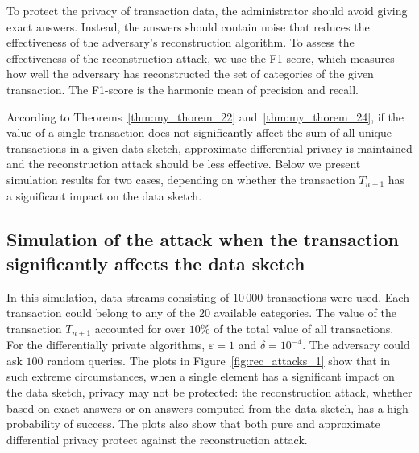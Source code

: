 To protect the privacy of transaction data, the administrator should avoid giving exact answers. Instead, the answers should contain noise that reduces the effectiveness of the adversary's reconstruction algorithm. To assess the effectiveness of the reconstruction attack, we use the F1-score, which measures how well the adversary has reconstructed the set of categories of the given transaction. The F1-score is the harmonic mean of precision and recall.

According to Theorems~\ref{thm:my_thorem_22} and~\ref{thm:my_thorem_24}, if the value of a single transaction does not significantly affect the sum of all unique transactions in a given data sketch, approximate differential privacy is maintained and the reconstruction attack should be less effective. Below we present simulation results for two cases, depending on whether the transaction $T_{n+1}$ has a significant impact on the data sketch.

\subsection{Simulation of the attack when the transaction significantly affects the data sketch}

In this simulation, data streams consisting of $10\,000$ transactions were used. Each transaction could belong to any of the $20$ available categories. The value of the transaction $T_{n+1}$ accounted for over $10\%$ of the total value of all transactions. For the differentially private algorithms, $\varepsilon = 1$ and $\delta = 10^{-4}$. The adversary could ask $100$ random queries. The plots in Figure~\ref{fig:rec_attacks_1} show that in such extreme circumstances, when a single element has a significant impact on the data sketch, privacy may not be protected: the reconstruction attack, whether based on exact answers or on answers computed from the data sketch, has a high probability of success. The plots also show that both pure and approximate differential privacy protect against the reconstruction attack.

